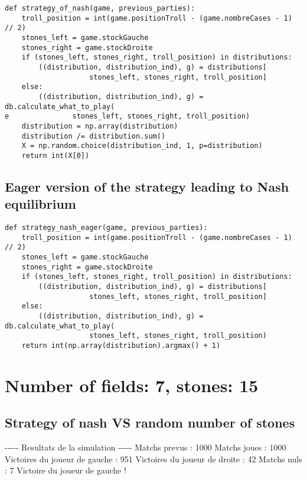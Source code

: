 \documentclass{article}%
\begin{document}
\begin{verbatim}
def strategy_of_nash(game, previous_parties):
	troll_position = int(game.positionTroll - (game.nombreCases - 1) // 2)
	stones_left = game.stockGauche
	stones_right = game.stockDroite
	if (stones_left, stones_right, troll_position) in distributions:
		((distribution, distribution_ind), g) = distributions[
					stones_left, stones_right, troll_position]
	else:
		((distribution, distribution_ind), g) = db.calculate_what_to_play(
e				stones_left, stones_right, troll_position)
	distribution = np.array(distribution)
	distribution /= distribution.sum()
	X = np.random.choice(distribution_ind, 1, p=distribution)
	return int(X[0])
\end{verbatim}

\subsection{Eager version of the strategy leading to Nash equilibrium}

\begin{verbatim}
def strategy_nash_eager(game, previous_parties):
	troll_position = int(game.positionTroll - (game.nombreCases - 1) // 2)
	stones_left = game.stockGauche
	stones_right = game.stockDroite
	if (stones_left, stones_right, troll_position) in distributions:
		((distribution, distribution_ind), g) = distributions[
					stones_left, stones_right, troll_position]
	else:
		((distribution, distribution_ind), g) = db.calculate_what_to_play(
					stones_left, stones_right, troll_position)
	return int(np.array(distribution).argmax() + 1)
\end{verbatim}

\section{Number of fields: 7, stones: 15}%
\label{sec:Number of fields 7, stones 15}%
\subsection{Strategy of nash VS random number of stones}%
\label{subsec:Strategy of nash VS random number of stones}%
{-}{-}{-}{-}{-} Resultats de la simulation {-}{-}{-}{-}{-}\newline%
		\newline%
Matchs prevus : 1000\newline%
Matchs joues : 1000\newline%
\newline%
Victoires du joueur de gauche : 951\newline%
Victoires du joueur de droite : 42\newline%
Matchs nuls : 7\newline%
\newline%
Victoire du joueur de gauche !
\end{document}
